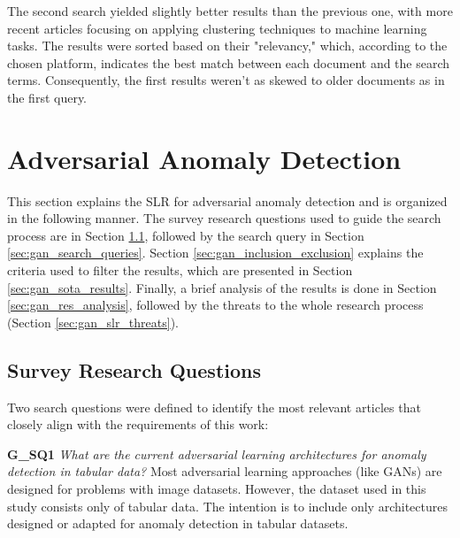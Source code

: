 The second search yielded slightly better results than the previous one, with more recent articles focusing on applying clustering techniques to machine learning tasks. The results were sorted based on their "relevancy," which, according to the chosen platform, indicates the best match between each document and the search terms. Consequently, the first results weren't as skewed to older documents as in the first query.


\newpage %


\section{Adversarial Anomaly Detection}\label{sec:sota_anomaly_detection}
This section explains the SLR for adversarial anomaly detection and is organized in the following manner. The survey research questions used to guide the search process are in Section \ref{sec:gan_search_questions}, followed by the search query in Section \ref{sec:gan_search_queries}. Section \ref{sec:gan_inclusion_exclusion} explains the criteria used to filter the results, which are presented in Section \ref{sec:gan_sota_results}. Finally, a brief analysis of the results is done in Section \ref{sec:gan_res_analysis}, followed by the threats to the whole research process (Section \ref{sec:gan_slr_threats}).

\subsection{Survey Research Questions}\label{sec:gan_search_questions}
Two search questions were defined to identify the most relevant articles that closely align with the requirements of this work:


\noindent\textbf{G\_SQ1} \textit{What are the current adversarial learning architectures for anomaly detection in tabular data?} Most adversarial learning approaches (like GANs) are designed for problems with image datasets. However, the dataset used in this study consists only of tabular data. The intention is to include only architectures designed or adapted for anomaly detection in tabular datasets.

